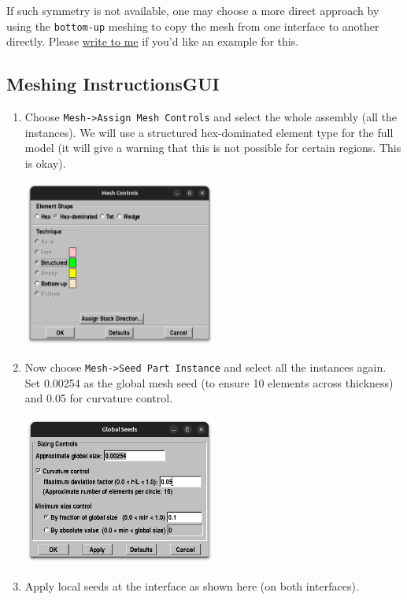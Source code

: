 \documentclass[11pt]{article}
\begin{document}
If such symmetry is not available, one may choose a more direct approach by using the \texttt{bottom-up} meshing to copy the mesh from one interface to another directly.
Please \href{mailto:nidish.balaji@ila.uni-stuttgart.de}{write to me} if you'd like an example for this.
\subsection{Meshing Instructions\hfill{}\textsc{GUI}}
\label{sec:org97761ba}
\begin{enumerate}
\item Choose \texttt{Mesh->Assign Mesh Controls} and select the whole assembly (all the instances).
We will use a structured hex-dominated element type for the full model (it will give a warning that this is not possible for certain regions. This is okay).
\begin{center}
\includegraphics[width=0.5\textwidth]{./figs/globmesh.png}
\end{center}
\item Now choose \texttt{Mesh->Seed Part Instance} and select all the instances again.
Set 0.00254 as the global mesh seed (to ensure 10 elements across thickness) and 0.05 for curvature control.
\begin{center}
\includegraphics[width=0.5\textwidth]{./figs/gmeshseed.png}
\end{center}
\item Apply local seeds at the interface as shown here (on both interfaces).

\end{enumerate}
\end{document}
